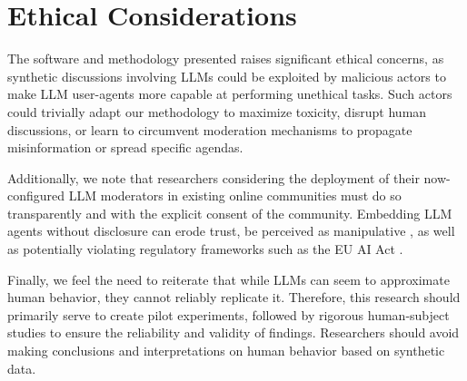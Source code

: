 %
\section{Ethical Considerations}
\label{sec:ethical}

The software and methodology presented raises significant ethical concerns, as synthetic discussions involving \acp{LLM} could be exploited by malicious actors to make \ac{LLM} user-agents more capable at performing unethical tasks. Such actors could trivially adapt our methodology to  maximize toxicity, disrupt human discussions, or learn to circumvent moderation mechanisms to propagate misinformation or spread specific agendas. 

Additionally, we note that researchers considering the deployment of their now-configured \ac{LLM} moderators in existing online communities must do so transparently and with the explicit consent of the community. Embedding \ac{LLM} agents without disclosure can erode trust, be perceived as manipulative \cite{retraction_watch}, as well as potentially violating regulatory frameworks such as the EU AI Act \cite{eu_ai_act_2024}.

Finally, we feel the need to reiterate that while \acp{LLM} can seem to approximate human behavior, they cannot reliably replicate it. Therefore, this research should primarily serve to create pilot experiments, followed by rigorous human-subject studies to ensure the reliability and validity of findings. Researchers should avoid making conclusions and interpretations on human behavior based on synthetic data.